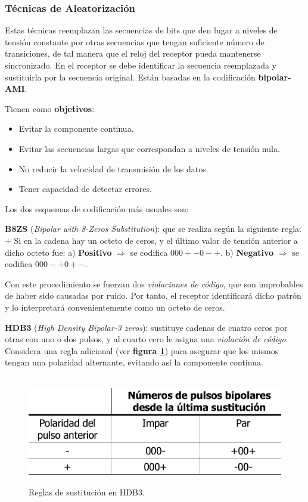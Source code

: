 \documentclass[10pt,a4paper]{article}
\begin{document}
\subsubsection{Técnicas de Aleatorización}

Estas técnicas reemplazan las secuencias de bits que den lugar a niveles de tensión constante por otras secuencias que tengan suficiente número de transiciones, de tal manera que el reloj del receptor pueda mantenerse sincronizado. En el receptor se debe identificar la secuencia reemplazada y sustituirla por la secuencia original. Están basadas en la codificación \textbf{bipolar-AMI}.

Tienen como \textbf{objetivos}:
\begin{itemize}
\item Evitar la componente continua.
\item Evitar las secuencias largas que correspondan a niveles de tensión nula.
\item No reducir la velocidad de transmisión de los datos.
\item Tener capacidad de detectar errores.
\end{itemize}

Los dos esquemas de codificación más usuales son:
\begin{description}
\item \textbf{B8ZS} (\textit{Bipolar with 8-Zeros Substitution}): que se realiza según la siguiente regla:
\subitem + Si en la cadena hay un octeto de ceros, y el último valor de tensión anterior a dicho octeto fue:
\subitem a) \textbf{Positivo} $\Rightarrow$ se codifica $000+-0-+$.
\subitem b) \textbf{Negativo} $\Rightarrow$ se codifica $000-+0+-$.

Con este procedimiento se fuerzan dos \textit{violaciones de código}, que son improbables de haber sido causadas por ruido. Por tanto, el receptor identificará dicho patrón y lo interpretará convenientemente como un octeto de ceros.
\item \textbf{HDB3} (\textit{High Density Bipolar-3 zeros}): sustituye cadenas de cuatro ceros por otras con uno o dos pulsos, y al cuarto cero le asigna una \textit{violación de código}. Considera una regla adicional (ver \textbf{figura \ref{fig:hdb3}}) para asegurar que los mismos tengan una polaridad alternante, evitando así la componente continua.
\end{description}

\begin{figure}
  \caption{Reglas de sustitución en HDB3.}
  \label{fig:hdb3}  
  \centering
  \hbox{
	\includegraphics[width=0.5\textwidth-\fboxrule-\fboxrule]{imgs/hdb3.png}}
\end{figure}
\end{document}

